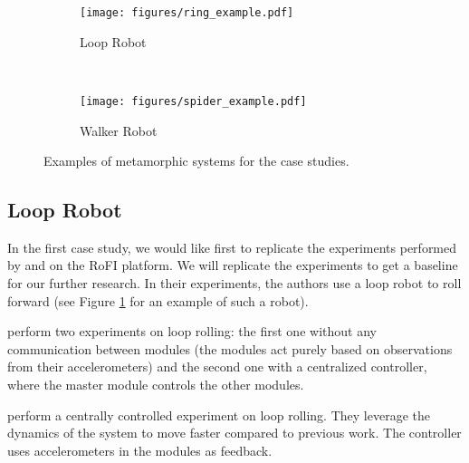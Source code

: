 \begin{figure}[!t]
    \centering
    \begin{subfigure}[b]{0.45\textwidth}
        \texttt{[image: figures/ring\_example.pdf]}
        \caption{Loop Robot}
        \label{fig:example_roller}
    \end{subfigure}
    ~
    \begin{subfigure}[b]{0.45\textwidth}
        \texttt{[image: figures/spider\_example.pdf]}
        \caption{Walker Robot}
        \label{fig:example_spider}
    \end{subfigure}

    \caption{Examples of metamorphic systems for the case studies.}
\end{figure}

\subsection{Loop Robot}

In the first case study, we would like first to replicate the experiments
performed by \textcite{superbotroller} and
\textcite{DBLP:journals/ijrr/SastraCY09} on the RoFI platform. We will replicate
the experiments to get a baseline for our further research. In their
experiments, the authors use a loop robot to roll forward (see Figure
\ref{fig:example_roller} for an example of such a robot).

\textcite{superbotroller} perform two experiments on loop rolling: the first one
without any communication between modules (the modules act purely based on
observations from their accelerometers) and the second one with a centralized
controller, where the master module controls the other modules.

\textcite{DBLP:journals/ijrr/SastraCY09} perform a centrally controlled
experiment on loop rolling. They leverage the dynamics of the system to move
faster compared to previous work. The controller uses accelerometers in the
modules as feedback.

